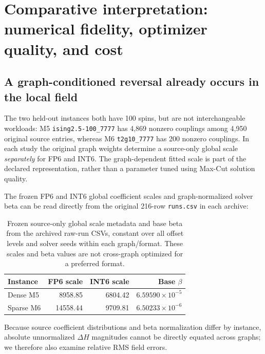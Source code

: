 \section{Comparative interpretation: numerical fidelity, optimizer quality, and cost}
\label{sec:heldout-synthesis}

\subsection{A graph-conditioned reversal already occurs in the local field}

The two held-out instances both have 100 spins, but are
not interchangeable workloads: M5 \texttt{ising2.5-100\_7777}
has 4,869 nonzero couplings among 4,950 original source entries,
whereas M6 \texttt{t2g10\_7777} has 200 nonzero couplings.
In each study the original graph weights determine a
source-only global scale \emph{separately} for FP6 and INT6.
The graph-dependent fitted scale is part of the declared
representation, rather than a parameter tuned using Max-Cut
solution quality.

The frozen FP6 and INT6 global coefficient scales
and graph-normalized solver beta can be read directly
from the original 216-row \texttt{runs.csv} in each archive:
\begin{table}[htbp]\centering\small
\begin{tabular}{@{}l rrr@{}}\toprule
Instance & FP6 scale & INT6 scale & Base $\beta$\\\midrule
Dense M5 & 8958.85 & 6804.42 & $6.59590\times10^{-5}$\\
Sparse M6 & 14558.44 & 9709.81 & $6.50233\times10^{-6}$\\\bottomrule
\end{tabular}
\caption{Frozen source-only global scale metadata and base
beta from the archived raw-run CSVs, constant over all
offset levels and solver seeds within each graph/format.
These scales and beta values are not cross-graph
optimized for a preferred format.}
\label{tab:heldout-scales}
\end{table}
Because source coefficient distributions and beta normalization
differ by instance, absolute unnormalized $\Delta H$
magnitudes cannot be directly equated across graphs;
we therefore also examine relative RMS field errors.

